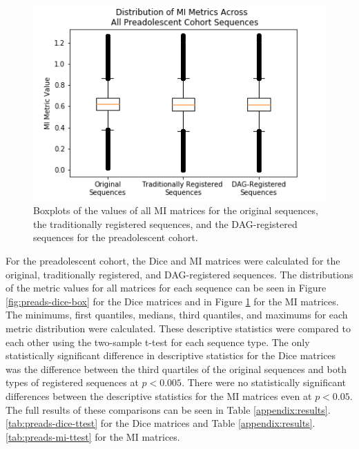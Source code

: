 \begin{figure}[]
\centering
\includegraphics[height=0.3\textheight]{6/figures/preads-mi-box.png}
\caption{Boxplots of the values of all MI matrices for the original sequences, the traditionally registered sequences, and the DAG-registered sequences for the preadolescent cohort.}
\label{fig:preads-mi-box}
\end{figure}

For the preadolescent cohort, the Dice and MI matrices were calculated for the original, traditionally registered, and DAG-registered sequences. The distributions of the metric values for all matrices for each sequence can be seen in Figure \ref{fig:preads-dice-box} for the Dice matrices and in Figure \ref{fig:preads-mi-box} for the MI matrices. The minimums, first quantiles, medians, third quantiles, and maximums for each metric distribution were calculated. These descriptive statistics were compared to each other using the two-sample t-test for each sequence type. The only statistically significant difference in descriptive statistics for the Dice matrices was the difference between the third quartiles of the original sequences and both types of registered sequences at $p < 0.005$. There were no statistically significant differences between the descriptive statistics for the MI matrices even at $p < 0.05$. The full results of these comparisons can be seen in Table \ref{appendix:results}.\ref{tab:preads-dice-ttest} for the Dice matrices and Table \ref{appendix:results}.\ref{tab:preads-mi-ttest} for the MI matrices.

